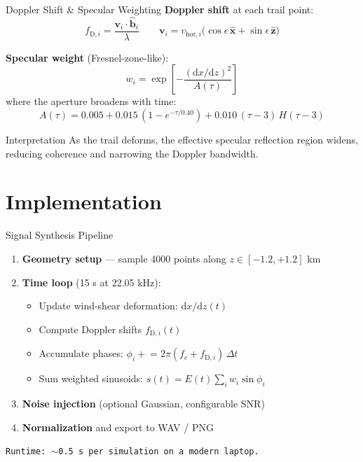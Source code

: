 \documentclass[aspectratio=169,11pt]{beamer}
\begin{document}
\begin{frame}{Doppler Shift \& Specular Weighting}
\textbf{Doppler shift} at each trail point:
\[
f_{\mathrm{D},i} = \frac{\mathbf{v}_i \cdot \hat{\mathbf{b}}_i}{\lambda}
\qquad
\mathbf{v}_i = v_{\mathrm{hor},i}\bigl(\cos\epsilon\,\hat{\mathbf{x}} + \sin\epsilon\,\hat{\mathbf{z}}\bigr)
\]

\textbf{Specular weight} (Fresnel-zone-like):
\[
w_i = \exp\!\left[ -\frac{(\mathrm{d}x/\mathrm{d}z)^2}{A(\tau)} \right]
\]
where the aperture broadens with time:
\[
A(\tau) = 0.005 + 0.015\,(1-e^{-\tau/0.40}) + 0.010\,(\tau - 3)\,H(\tau-3)
\]

\begin{block}{Interpretation}
As the trail deforms, the effective specular reflection region widens, reducing coherence and narrowing the Doppler bandwidth.
\end{block}
\end{frame}

\section{Implementation}
\begin{frame}{Signal Synthesis Pipeline}
\begin{enumerate}
    \item \textbf{Geometry setup} --- sample 4000 points along $z \in [-1.2, +1.2]$ km
    \item \textbf{Time loop} (15 s at 22.05 kHz):
    \begin{itemize}
        \item Update wind-shear deformation: $\mathrm{d}x/\mathrm{d}z(t)$
        \item Compute Doppler shifts $f_{\mathrm{D},i}(t)$
        \item Accumulate phases: $\phi_i \mathrel{+}= 2\pi(f_c + f_{\mathrm{D},i})\,\Delta t$
        \item Sum weighted sinusoids: $s(t) = E(t) \sum_i w_i \sin\phi_i$
    \end{itemize}
    \item \textbf{Noise injection} (optional Gaussian, configurable SNR)
    \item \textbf{Normalization} and export to WAV / PNG
\end{enumerate}
\vspace{0.3em}
\texttt{Runtime: $\sim$0.5 s per simulation on a modern laptop.}
\end{frame}
\end{document}
